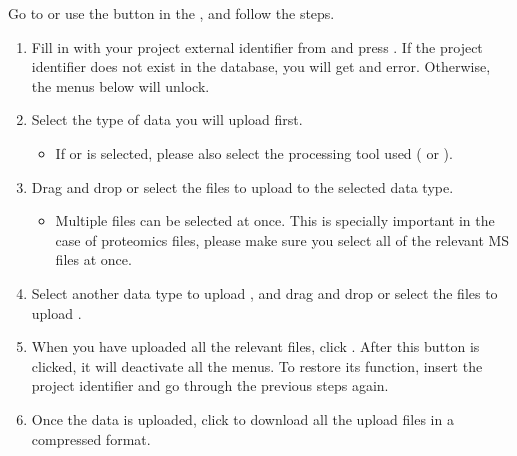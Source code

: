 \documentclass[letterpaper,10pt,english]{sphinxmanual}
\begin{document}
Go to  or use the  button in the , and follow the steps.
\begin{enumerate}
%
\item {} 
Fill in  with your project external identifier from {\hyperref[\detokenize{getting_started/create-new-project:project-creation}]{}} and press .  If the project identifier does not exist in the database, you will get and error. Otherwise, the menus below will unlock.

\item {} 
Select the type of data you will upload first. 
\begin{itemize}
\item {} 
If  or  is selected, please also select the processing tool used ( or ). 

\end{itemize}

\item {} 
Drag and drop or select the files to upload to the selected data type. 
\begin{itemize}
\item {} 
Multiple files can be selected at once. This is specially important in the case of proteomics files, please make sure you select all of the relevant MS files at once.

\end{itemize}

\item {} 
Select another data type to upload , and drag and drop or select the files to upload .

\item {} 
When you have uploaded all the relevant files, click . After this button is clicked, it will deactivate all the menus. To restore its function, insert the project identifier and go through the previous steps again. 

\item {} 
Once the data is uploaded, click  to download all the upload files in a compressed format. 

\end{enumerate}
\end{document}
